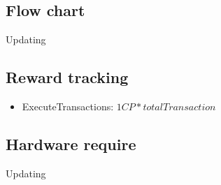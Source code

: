 \documentclass[a4paper, 11pt]{article}
\begin{document}
\subsection{Flow chart}
Updating
\subsection{Reward tracking}
\begin{itemize}
    \item ExecuteTransactions: $1CP * total Transaction$
\end{itemize}

\subsection{Hardware require}
Updating

\pagebreak


\end{document}
